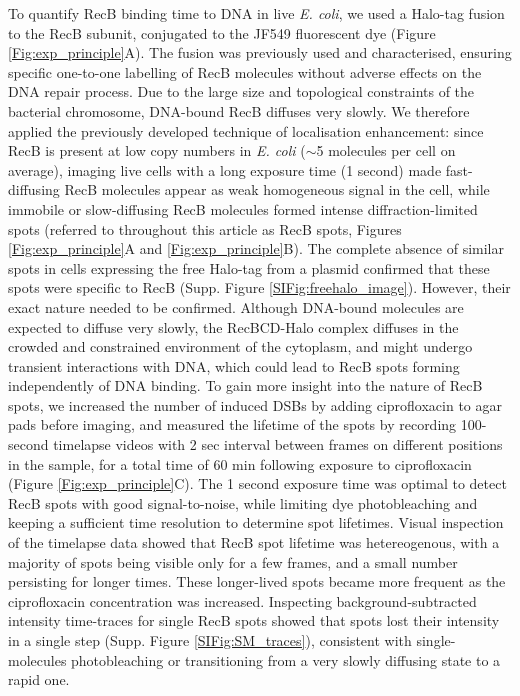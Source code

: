 To quantify RecB binding time to DNA in live \textit{E. coli}, we used a Halo-tag fusion to the RecB subunit, conjugated to the JF549 fluorescent dye (Figure \ref{Fig:exp_principle}A). The fusion was previously used and characterised, ensuring specific one-to-one labelling of RecB molecules without adverse effects on the DNA repair process\cite{Lepore2019a,Lepore2023}. Due to the large size and topological constraints of the bacterial chromosome, DNA-bound RecB diffuses very slowly\cite{Lepore2023}. We therefore applied the previously developed technique of localisation enhancement\cite{Yu2006, Elf2007}: since RecB is present at low copy numbers in \textit{E. coli} ($\sim$5 molecules per cell on average\cite{Lepore2019a}), imaging live cells with a long exposure time (1 second) made fast-diffusing RecB molecules appear as weak homogeneous signal in the cell, while immobile or slow-diffusing RecB molecules formed intense diffraction-limited spots (referred to throughout this article as RecB spots, Figures \ref{Fig:exp_principle}A and \ref{Fig:exp_principle}B). The complete absence of similar spots in cells expressing the free Halo-tag from a plasmid confirmed that these spots were specific to RecB (Supp. Figure \ref{SIFig:freehalo_image}). However, their exact nature needed to be confirmed. Although DNA-bound molecules are expected to diffuse very slowly, the RecBCD-Halo complex diffuses in the crowded and constrained environment of the cytoplasm, and might undergo transient interactions with DNA\cite{Lepore2023}, which could lead to RecB spots forming independently of DNA binding. To gain more insight into the nature of RecB spots, we increased the number of induced DSBs by adding ciprofloxacin to agar pads before imaging, and measured the lifetime of the spots by recording 100-second timelapse videos with 2 sec interval between frames on different positions in the sample, for a total time of 60 min following exposure to ciprofloxacin (Figure \ref{Fig:exp_principle}C). The 1 second exposure time was optimal to detect RecB spots with good signal-to-noise, while limiting dye photobleaching and keeping a sufficient time resolution to determine spot lifetimes. Visual inspection of the timelapse data showed that RecB spot lifetime was hetereogenous, with a majority of spots being visible only for a few frames, and a small number persisting for longer times. These longer-lived spots became more frequent as the ciprofloxacin concentration was increased. Inspecting background-subtracted intensity time-traces for single RecB spots showed that spots lost their intensity in a single step (Supp. Figure \ref{SIFig:SM_traces}), consistent with single-molecules photobleaching or transitioning from a very slowly diffusing state to a rapid one.

